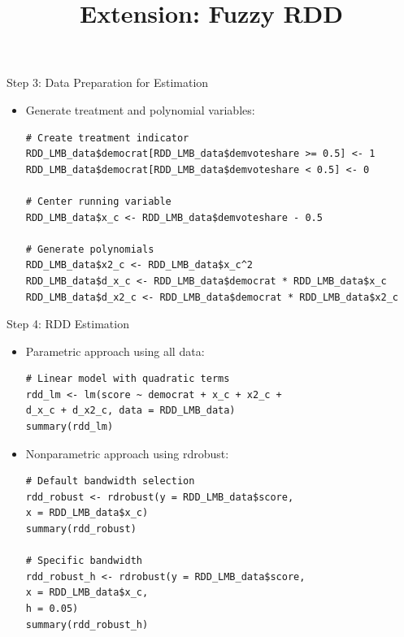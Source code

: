 \documentclass[dvipsnames,hyperref={pdfpagelabels=false}]{beamer}
\begin{document}
\begin{frame}[fragile]{Step 3: Data Preparation for Estimation}
	\begin{itemize}
		\item Generate treatment and polynomial variables:
\begin{lstlisting}
# Create treatment indicator
RDD_LMB_data$democrat[RDD_LMB_data$demvoteshare >= 0.5] <- 1
RDD_LMB_data$democrat[RDD_LMB_data$demvoteshare < 0.5] <- 0

# Center running variable
RDD_LMB_data$x_c <- RDD_LMB_data$demvoteshare - 0.5

# Generate polynomials
RDD_LMB_data$x2_c <- RDD_LMB_data$x_c^2
RDD_LMB_data$d_x_c <- RDD_LMB_data$democrat * RDD_LMB_data$x_c
RDD_LMB_data$d_x2_c <- RDD_LMB_data$democrat * RDD_LMB_data$x2_c
\end{lstlisting}
	\end{itemize}
\end{frame}

\begin{frame}[fragile]{Step 4: RDD Estimation}
	\begin{itemize}
		\item Parametric approach using all data:
\begin{lstlisting}
# Linear model with quadratic terms
rdd_lm <- lm(score ~ democrat + x_c + x2_c + 
d_x_c + d_x2_c, data = RDD_LMB_data)
summary(rdd_lm)
\end{lstlisting}
		
		\item Nonparametric approach using rdrobust:
\begin{lstlisting}
# Default bandwidth selection
rdd_robust <- rdrobust(y = RDD_LMB_data$score, 
x = RDD_LMB_data$x_c)
summary(rdd_robust)

# Specific bandwidth
rdd_robust_h <- rdrobust(y = RDD_LMB_data$score, 
x = RDD_LMB_data$x_c,
h = 0.05)
summary(rdd_robust_h)
\end{lstlisting}
	\end{itemize}
\end{frame}






\title[]  
{Extension: Fuzzy RDD}


\author 
{}

\institute{}
\end{document}
